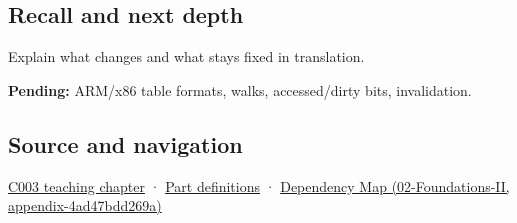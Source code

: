 \subsection{Recall and next depth}\label{appendix-01e5905165c4-recall-and-next-depth}

Explain what changes and what stays fixed in translation.

\textbf{Pending:} ARM/x86 table formats, walks, accessed/dirty bits, invalidation.

\subsection{Source and navigation}\label{appendix-01e5905165c4-source-and-navigation}

\hyperref[01-foundations-i-ch002-where-the-bytes-live]{C003 teaching chapter} · \hyperref[appendix-fd090d982a15-m003---parts-41-60]{Part definitions} · \href{../02-Foundations-II/main.pdf\#nameddest=appendix-4ad47bdd269a}{Dependency Map (02-Foundations-II, appendix-4ad47bdd269a)}
